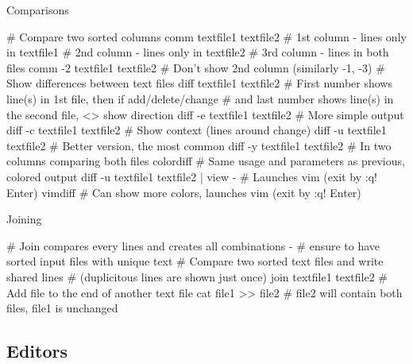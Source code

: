 \documentclass[compress, ucs, xelatex, 11pt, xcolor=svgnames,
  hyperref={
    bookmarks=true,
    unicode=true,
    colorlinks=true,
    pdftitle={Linux, command line and MetaCentrum},
    plainpages=false,
    pdfauthor={Vojtech Zeisek},
    pdfsubject={Course about use of Linux command line, writing shell scripts and using MetaCentrum of CESNET},
    pdfcreator={XeLaTeX},
    pdfkeywords={Linux, GNU, BASH, shell, command line, MetaCentrum},
    linkcolor=DarkRed,
    anchorcolor=DarkBlue,
    citecolor=Indigo,
    filecolor=NavyBlue,
    menucolor=DarkMagenta,
    urlcolor=DarkBlue,
    pdftex},
  url={hyphens, lowtilde} %
  ]{beamer}
\begin{document}
\begin{frame}[fragile]{Comparisons}
  \begin{bashcode}
    # Compare two sorted columns
    comm textfile1 textfile2
      # 1st column - lines only in textfile1
      # 2nd column - lines only in textfile2
      # 3rd column - lines in both files
    comm -2 textfile1 textfile2 # Don't show 2nd column (similarly -1, -3)
    # Show differences between text files
    diff textfile1 textfile2
      # First number shows line(s) in 1st file, then if add/delete/change
      # and last number shows line(s) in the second file, <> show direction
    diff -e textfile1 textfile2 # More simple output
    diff -c textfile1 textfile2 # Show context (lines around change)
    diff -u textfile1 textfile2 # Better version, the most common
    diff -y textfile1 textfile2 # In two columns comparing both files
    colordiff # Same usage and parameters as previous, colored output
    diff -u textfile1 textfile2 | view - # Launches vim (exit by :q! Enter)
    vimdiff # Can show more colors, launches vim (exit by :q! Enter)
  \end{bashcode}
\end{frame}

\begin{frame}[fragile]{Joining}
  \begin{bashcode}
    # Join compares every lines and creates all combinations -
    # ensure to have sorted input files with unique text
    # Compare two sorted text files and write shared lines
    # (duplicitous lines are shown just once)
    join textfile1 textfile2
    # Add file to the end of another text file
    cat file1 >> file2 # file2 will contain both files, file1 is unchanged
  \end{bashcode}
\end{frame}

\subsection{Editors} 
\end{document}
